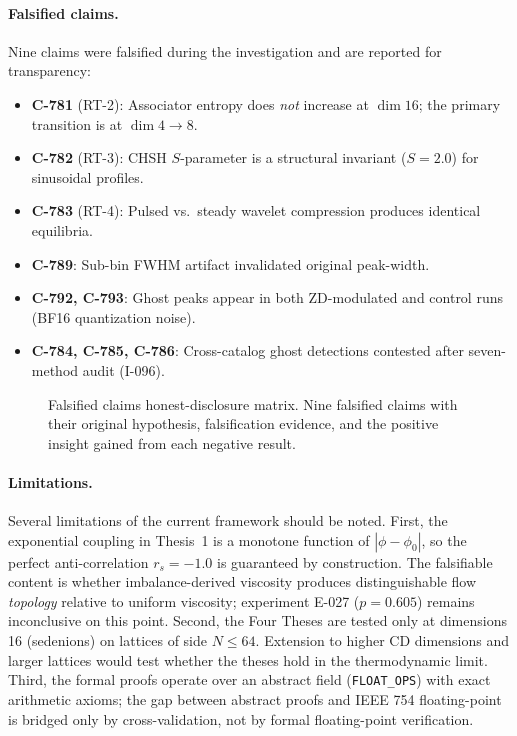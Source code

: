 \documentclass[12pt,openany]{report}
\theoremstyle{definition}
\theoremstyle{plain}
\theoremstyle{remark}
\begin{document}
\paragraph{Falsified claims.}
Nine claims were falsified during the investigation and are reported for
transparency:
\begin{itemize}
  \item \textbf{C-781} (RT-2): Associator entropy does \emph{not}
    increase at $\dim 16$; the primary transition is at $\dim 4 \to 8$.
  \item \textbf{C-782} (RT-3): CHSH $S$-parameter is a structural
    invariant ($S = 2.0$) for sinusoidal profiles.
  \item \textbf{C-783} (RT-4): Pulsed vs.\ steady wavelet compression
    produces identical equilibria.
  \item \textbf{C-789}: Sub-bin FWHM artifact invalidated original peak-width.
  \item \textbf{C-792, C-793}: Ghost peaks appear in both ZD-modulated and
    control runs (BF16 quantization noise).
  \item \textbf{C-784, C-785, C-786}: Cross-catalog ghost detections
    contested after seven-method audit (I-096).
\end{itemize}

\begin{figure}[htbp]
\centering

\caption{Falsified claims honest-disclosure matrix.  Nine falsified
claims with their original hypothesis, falsification evidence, and
the positive insight gained from each negative result.}
\label{fig:falsified}
\end{figure}

\paragraph{Limitations.}
Several limitations of the current framework should be noted.
First, the exponential coupling in Thesis~1 is a monotone function of
$|\phi - \phi_0|$, so the perfect anti-correlation $r_s = -1.0$ is
guaranteed by construction.  The falsifiable content is whether
imbalance-derived viscosity produces distinguishable flow
\emph{topology} relative to uniform viscosity; experiment E-027
($p = 0.605$) remains inconclusive on this point.
Second, the Four Theses are tested only at dimensions 16 (sedenions)
on lattices of side $N \leq 64$.  Extension to higher CD dimensions
and larger lattices would test whether the theses hold in the
thermodynamic limit.
Third, the formal proofs operate over an abstract field
(\texttt{FLOAT\_OPS}) with exact arithmetic axioms; the gap between
abstract proofs and IEEE 754 floating-point is bridged only by
cross-validation, not by formal floating-point verification.
\end{document}

